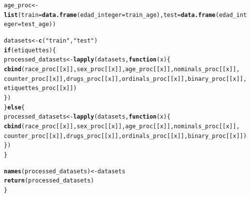 \documentclass{article}\usepackage[]{graphicx}\usepackage[]{color}
\makeatletter
\newcommand{\hlstr}[1]{\textcolor[rgb]{0.192,0.494,0.8}{#1}}%
\newcommand{\hlstd}[1]{\textcolor[rgb]{0.345,0.345,0.345}{#1}}%
\newcommand{\hlkwa}[1]{\textcolor[rgb]{0.161,0.373,0.58}{\textbf{#1}}}%
\newcommand{\hlkwb}[1]{\textcolor[rgb]{0.69,0.353,0.396}{#1}}%
\newcommand{\hlkwc}[1]{\textcolor[rgb]{0.333,0.667,0.333}{#1}}%
\newcommand{\hlkwd}[1]{\textcolor[rgb]{0.737,0.353,0.396}{\textbf{#1}}}%
\newenvironment{kframe}{%
 \def\at@end@of@kframe{}%
 \ifinner\ifhmode%
  \def\at@end@of@kframe{\end{minipage}}%
  \begin{minipage}{\columnwidth}%
 \fi\fi%
 \def\FrameCommand##1{\hskip\@totalleftmargin \hskip-\fboxsep
 \colorbox{shadecolor}{##1}\hskip-\fboxsep
     \hskip-\linewidth \hskip-\@totalleftmargin \hskip\columnwidth}%
 \MakeFramed {\advance\hsize-\width
   \@totalleftmargin\z@ \linewidth\hsize
   \@setminipage}}%
 {\par\unskip\endMakeFramed%
 \at@end@of@kframe}
\newenvironment{knitrout}{}{} %
\makeatother
\begin{document}
\begin{knitrout}
\begin{kframe}
\begin{alltt}
    \hlstd{age_proc} \hlkwb{<-} \hlkwd{list}\hlstd{(}\hlkwc{train} \hlstd{=} \hlkwd{data.frame}\hlstd{(}\hlkwc{edad_integer} \hlstd{= train_age),} \hlkwc{test} \hlstd{=} \hlkwd{data.frame}\hlstd{(}\hlkwc{edad_integer} \hlstd{= test_age))}

    \hlstd{datasets} \hlkwb{<-} \hlkwd{c}\hlstd{(}\hlstr{"train"}\hlstd{,} \hlstr{"test"}\hlstd{)}
    \hlkwa{if} \hlstd{(etiquettes) \{}
        \hlstd{processed_datasets} \hlkwb{<-} \hlkwd{lapply}\hlstd{(datasets,} \hlkwa{function}\hlstd{(}\hlkwc{x}\hlstd{) \{}
            \hlkwd{cbind}\hlstd{(race_proc[[x]], sex_proc[[x]], age_proc[[x]], nominals_proc[[x]],}
                \hlstd{counter_proc[[x]], drugs_proc[[x]], ordinals_proc[[x]], binary_proc[[x]],}
                \hlstd{etiquettes_proc[[x]])}
        \hlstd{\})}
    \hlstd{\}} \hlkwa{else} \hlstd{\{}
        \hlstd{processed_datasets} \hlkwb{<-} \hlkwd{lapply}\hlstd{(datasets,} \hlkwa{function}\hlstd{(}\hlkwc{x}\hlstd{) \{}
            \hlkwd{cbind}\hlstd{(race_proc[[x]], sex_proc[[x]], age_proc[[x]], nominals_proc[[x]],}
                \hlstd{counter_proc[[x]], drugs_proc[[x]], ordinals_proc[[x]], binary_proc[[x]])}
        \hlstd{\})}
    \hlstd{\}}

    \hlkwd{names}\hlstd{(processed_datasets)} \hlkwb{<-} \hlstd{datasets}
    \hlkwd{return}\hlstd{(processed_datasets)}
\hlstd{\}}
\end{alltt}
\end{kframe}
\end{knitrout}
\end{document}
